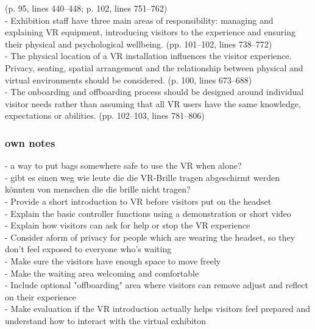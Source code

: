 (p. 95, lines 440–448; p. 102, lines 751–762)
\\
- Exhibition staff have three main areas of responsibility: managing and explaining VR equipment, introducing visitors to the experience and ensuring their physical and psychological wellbeing.
(pp. 101–102, lines 738–772)
\\
- The physical location of a VR installation influences the visitor experience. Privacy, seating, spatial arrangement and the relationship between physical and virtual environments should be considered.
(p. 100, lines 673–688)
\\
- The onboarding and offboarding process should be designed around individual visitor needs rather than assuming that all VR users have the same knowledge, expectations or abilities.
(pp. 102–103, lines 781–806)
\\

\subsubsection{own notes}
- a way to put bags somewhere safe to use the VR when alone?
\\
- gibt es einen weg wie leute die die VR-Brille tragen abgeschirmt werden könnten von menschen die die brille nicht tragen?
\\
- Provide a short introduction to VR before visitors put on the headset
\\
- Explain the basic controller functions using a demonstration or short video
\\
- Explain how visitors can ask for help or stop the VR experience
\\
- Consider aform of privacy for people which are wearing the headset, so they don't feel exposed to everyone who's waiting
\\
- Make sure the visitors have enough space to move freely
\\
- Make the waiting area welcoming and comfortable
\\
- Include optional "offboarding" area where visitors can remove adjust and reflect on their experience
\\
- Make evaluation if the VR introduction actually helps visitors feel prepared and understand how to interact with the virtual exhibiton
\\

